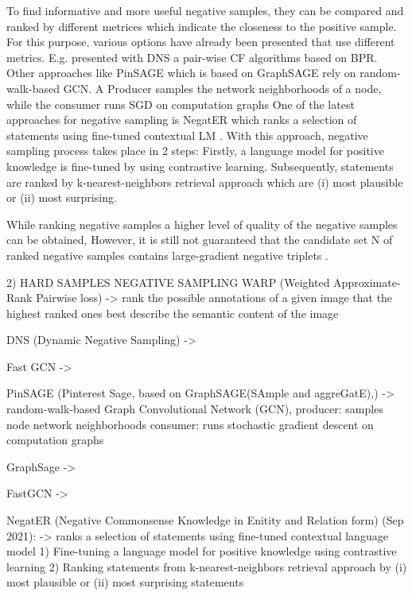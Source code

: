 To find informative and more useful negative samples, they can be compared and ranked by different metrices which indicate the closeness to the positive sample.
For this purpose, various options have already been presented that use different metrics.
E.g. \cite{DNS} presented with \ac{DNS} a pair-wise \ac{CF} algorithms based on \ac{BPR}.
Other approaches like \ac{PinSAGE} \cite{PinSAGE} which is based on \ac{GraphSAGE} \cite{GraphSAGE} rely on 
random-walk-based \ac{GCN}. 
A Producer samples the network neighborhoods of a node, while the consumer 
runs \ac{SGD} on computation graphs    
One of the latest approaches for negative sampling is \ac{NegatER}
which ranks a selection of statements using fine-tuned contextual \ac{LM} \cite{safavi2021negater}.
With this approach, negative sampling process takes place in 2 steps:
Firstly, a language model for positive knowledge is fine-tuned by using contrastive learning.
Subsequently, statements are ranked by k-nearest-neighbors retrieval approach which are (i) most plausible or (ii) most surprising.

 
While ranking negative samples a higher level of quality of the negative samples can be obtained,
However,  it is still not guaranteed that the candidate set N of ranked negative samples contains large-gradient negative triplets \cite{zhang2021efficient}.


    
    
2) HARD SAMPLES NEGATIVE SAMPLING
    WARP (Weighted Approximate-Rank Pairwise loss)
        -> rank the possible annotations of a given image that the highest ranked ones best describe the semantic content of the image
    
    DNS (Dynamic Negative Sampling)
         ->

    Fast GCN
        ->
        
    PinSAGE (Pinterest Sage, based on GraphSAGE(SAmple and aggreGatE),)
        -> random-walk-based Graph Convolutional Network (GCN),
        producer: samples node network neighborhoods
        consumer: runs stochastic gradient descent on computation graphs    

    GraphSage
        ->
        
    FastGCN
        -> 

    NegatER (Negative Commonsense Knowledge in Enitity and Relation form) (Sep 2021):
        -> ranks a selection of statements using fine-tuned contextual language model
        1) Fine-tuning a language model for positive knowledge using contrastive learning
        2) Ranking statements from k-nearest-neighbors retrieval approach by (i) most plausible or (ii) most surprising statements
    
